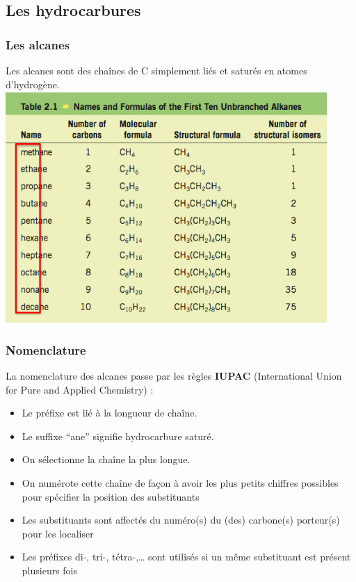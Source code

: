 \documentclass{article}
\begin{document}
    \subsection{Les hydrocarbures}
        \subsubsection{Les alcanes}
            Les alcanes sont des chaînes de C simplement liés et saturés en atomes d'hydrogène. \\
            \includegraphics{nomenclature_alcanes.png}
        
        \subsubsection{Nomenclature}
            La nomenclature des alcanes passe par les
            règles \textbf{IUPAC} (International Union for Pure and Applied Chemistry) :\\
            \begin{itemize}
                \item Le préfixe est lié à la longueur de chaîne.
                \item Le suffixe “ane” signifie hydrocarbure saturé.
                \item On sélectionne la chaîne la plus longue.
                \item On numérote cette chaîne de façon à avoir les plus petits chiffres
                possibles pour spécifier la position des substituants
                \item Les substituants sont affectés du numéro(s) du (des) carbone(s)
                porteur(s) pour les localiser
                \item Les préfixes di-, tri-, tétra-,… sont utilisés si un même substituant
                est présent plusieurs fois
            \end{itemize}
\end{document}
